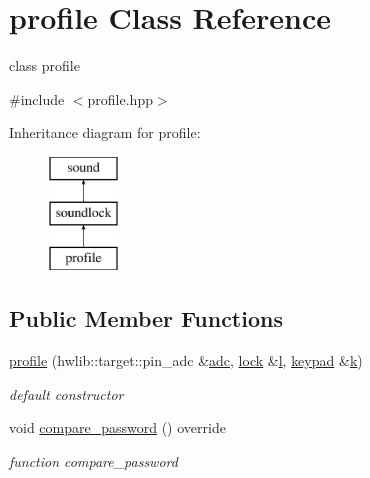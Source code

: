 \hypertarget{classprofile}{}\section{profile Class Reference}
\label{classprofile}


class profile  




{\ttfamily \#include $<$profile.\+hpp$>$}

Inheritance diagram for profile\+:\begin{figure}[H]
\begin{center}
\leavevmode
\includegraphics[height=3.000000cm]{classprofile}
\end{center}
\end{figure}
\subsection*{Public Member Functions}
\begin{DoxyCompactItemize}
\item 
\hyperlink{classprofile_a2cb04cbe48d335a623498255f4d4797a}{profile} (hwlib\+::target\+::pin\+\_\+adc \&\hyperlink{classsound_a1b4c38e994daa1b3e9006852d3d9242a}{adc}, \hyperlink{classlock}{lock} \&\hyperlink{classsoundlock_ade415e22f230dca2d7e7f93d14cec8b6}{l}, \hyperlink{classkeypad}{keypad} \&\hyperlink{classprofile_a0484e7cb5d93f01f21ad7cf8835c5ef9}{k})
\begin{DoxyCompactList}\small\item\em default constructor \end{DoxyCompactList}\item 
void \hyperlink{classprofile_acefbce03d19dafccbcf55c17b3527a23}{compare\+\_\+password} () override
\begin{DoxyCompactList}\small\item\em function compare\+\_\+password \end{DoxyCompactList}\end{DoxyCompactItemize}
